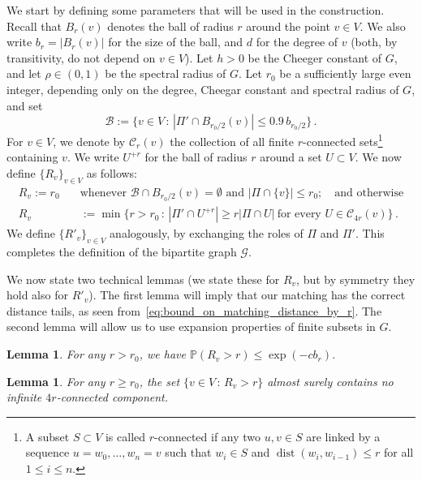 \documentclass[11pt, reqno]{article}
\newtheorem{lemma}[thm]{Lemma}
\numberwithin{equation}{section}
\theoremstyle{definition}
\def\cG{\mathcal{G}}
\def\cC{\mathcal{C}}
\def\cB{\mathcal{B}}
\def\P{\mathbb{P}}
\newcommand{\1}{\mathds{1}}
\DeclareMathOperator{\dist}{dist}
\begin{document}
\noindent
We start by defining some parameters that will be used in the construction. Recall that $B_r(v)$ denotes the ball of radius $r$ around the point $v\in V$. We also write $b_r = |B_r(v)|$ for the size of the ball, and $d$ for the degree of $v$ (both, by transitivity, do not depend on $v\in V$). Let $h>0$ be the Cheeger constant of $G$, and let $\rho \in (0,1)$ be the spectral radius of $G$. Let $r_0$ be a sufficiently large even integer, depending only on the degree, Cheegar constant and spectral radius of $G$, and set
\begin{equation}
    \label{eq:def_of_bad_points}
    \cB := \{ v\in V \, : \, |\Pi' \cap B_{r_0/2}(v)| \le 0.9 \,  b_{r_0/2} \} \, . 
\end{equation}
For $v\in V$, we denote by $\cC_r(v)$ the collection of all finite $r$-connected sets\footnote{A subset $S \subset V$ is called $r$-connected if any two $u,v \in S$ are linked by a sequence $u=w_0,\dots,w_n=v$ such that $w_i \in S$ and $\dist(w_i,w_{i-1}) \le r$ for all $1 \le i \le n$. } containing $v$. We write $U^{+r}$ for the ball of radius $r$ around a set $U \subset V$. We now define $\{R_v\}_{v\in V}$ as follows: 
\begin{align}\label{eq:def_of_R_v_in_nonamenable_case} \nonumber
    R_v := r_0 \quad  &\text{whenever \  $\cB \cap B_{r_0/2}(v) = \emptyset$ \  and \  $|\Pi \cap \{v\}| \le r_0$};  \quad \text{and otherwise} \\
R_v &:= \min\Big\{ r>r_0 \, : \, |\Pi'\cap U^{+r}| \ge r |\Pi \cap U| \ \text{for every } U\in \cC_{4r}(v) \Big\} \, .
\end{align} 
\noindent We define $\{R'_v\}_{v \in V}$ analogously, by exchanging the roles of $\Pi$ and $\Pi'$.
This completes the definition of the bipartite graph $\cG$.

We now state two technical lemmas (we state these for $R_v$, but by symmetry they hold also for $R'_v$).
The first lemma will imply that our matching has the correct distance tails, as seen from~\eqref{eq:bound_on_matching_distance_by_r}.
The second lemma will allow us to use expansion properties of finite subsets in $G$.

\begin{lemma}
    \label{lemma:tail_bound_for_non-amenable_R}
     For any $r>r_0$, we have $\P(R_v > r) \le \exp(-cb_r)$.
\end{lemma}


\begin{lemma}
    \label{lemma:almost_sure_no_infinite_connected_comp_for_R_large}
     For any $r \ge r_0$, the set $\{v\in V\, : \, R_v > r\}$ almost surely contains no infinite $4r$-connected component.
\end{lemma}
\end{document}

